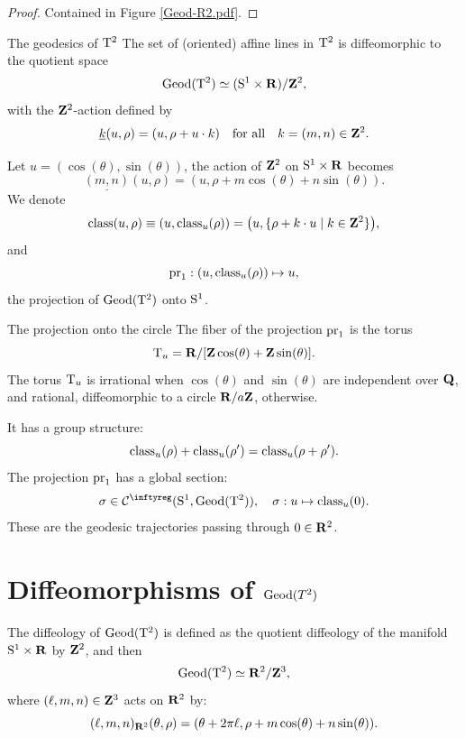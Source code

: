 \begin{proof}
  Contained in Figure \ref{Geod-R2.pdf}.
\end{proof}

\begin{Article}{The geodesics of $\mathrm{T}^2$}{}
  The set of (oriented) affine lines in $\mathrm{T}^2$ is diffeomorphic to the quotient space
  $$%
    \Geod(\Torus^2) \simeq (\Sph^1 \times \RR) / \ZZ^2,
    $$%
  with the $\mathbf{Z}^2$-action defined by
  $$%
    \underline{k}(u,\rho) = (u, \rho + u \cdot k)
    \quad \text{for all} \quad
    k = (m,n) \in \ZZ^2.
    $$%
\end{Article}

Let $u = (\cos(\theta), \sin(\theta))$,
the action of $\mathbf{Z}^2$ on $\mathrm{S}^1 \times \mathbf{R}$ becomes
$$%
  \underline{(m,n)}(u,\rho) = (u, \rho + m \cos(\theta) + n \sin(\theta)).
  $$%
We denote
$$%
  \Class(u,\rho) \equiv (u, \Class_u(\rho)) = \big(u, \{\rho + k \cdot u \mid k \in \ZZ^2 \}\big),
  $$%
and
$$%
  \Proj_1 : (u, \Class_u(\rho)) \mapsto u,
  $$%
the projection of $\operatorname{Geod}(\mathrm{T}^2)$ onto $\mathrm{S}^1$.

\begin{Article}{The projection onto the circle}{}
  The fiber of the projection $\operatorname{pr}_1$ is the torus
  $$%
    \Torus_u = \RR/[\ZZ \cos(\theta) + \ZZ \sin(\theta)].
    $$%
  The torus $\mathrm{T}_u$ is irrational when $\cos(\theta)$ and $\sin(\theta)$ are independent over $\mathbf{Q}$, and rational,
  diffeomorphic to a circle $\mathbf{R}/a\mathbf{Z}$,
  otherwise.
  
  It has a group structure:
  $$%
    \Class_u(\rho) + \Class_u(\rho') = \Class_u(\rho + \rho').
    $$%
  The projection $\operatorname{pr}_1$ has a global section:
  $$%
    \sigma \in \Cinfty(\Sph^1, \Geod(\Torus^2)), \quad \sigma : u \mapsto \Class_u(0).
    $$%
  These are the geodesic trajectories passing through $0 \in \mathbf{R}^2$.
\end{Article}

\section{Diffeomorphisms of $\operatorname{Geod}(T^2)$}

The diffeology of $\operatorname{Geod}(\mathrm{T}^2)$ is defined as the quotient diffeology of the manifold $\mathrm{S}^1 \times \mathbf{R}$ by $\mathbf{Z}^2$,
and then
$$%
  \Geod(\Torus^2) \simeq \RR^2/\ZZ^3,
  $$%
where $(\ell,m,n) \in \mathbf{Z}^3$ acts on $\mathbf{R}^2$ by:
$$%
  (\ell, m, n)_{\RR^2}(\theta,\rho) = (\theta + 2\pi\ell, \rho + m \cos(\theta) + n \sin(\theta)).
  $$%

